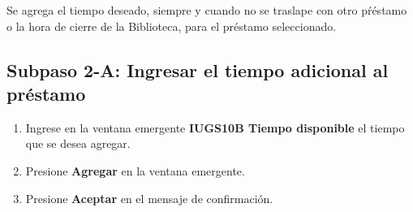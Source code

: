 Se agrega el tiempo deseado, siempre y cuando no se traslape con otro
pŕéstamo o la hora de cierre de la Biblioteca, para el préstamo seleccionado.

\subsection{Subpaso 2-A: Ingresar el tiempo adicional al préstamo}
\begin{enumerate}
	\item Ingrese en la ventana emergente 
		\textbf{IUGS10B Tiempo disponible} el tiempo que se desea agregar.
	\item Presione \textbf{Agregar} en la ventana emergente.
	\item Presione \textbf{Aceptar} en el mensaje de confirmación.
\end{enumerate}
